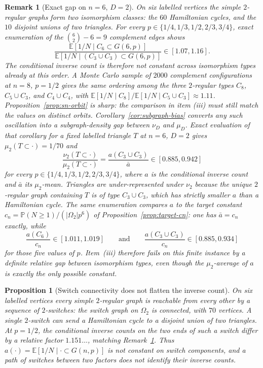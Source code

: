 \documentclass[11pt]{article}
\newtheorem{proposition}[theorem]{Proposition}
\newtheorem{remark}[theorem]{Remark}
\newcommand{\EE}{\mathbb{E}}
\newcommand{\PP}{\mathbb{P}}
\begin{document}
\begin{remark}[Exact gap on \(n=6\), \(D=2\)]
\label{rem:small-n-inv}
On six labelled vertices the simple \(2\)-regular graphs form two isomorphism
classes: the \(60\) Hamiltonian cycles, and the \(10\) disjoint unions of two
triangles.
For every \(p\in\{1/4,1/3,1/2,2/3,3/4\}\), exact enumeration of the
\(\binom{6}{2}-6=9\) complement edges shows
\[
\frac{\EE[1/N\mid C_6\subset G(6,p)]}{\EE[1/N\mid (C_3\cup C_3)\subset G(6,p)]}
\in
[1.07,1.16].
\]
The conditional inverse count is therefore not constant across isomorphism
types already at this order.
A Monte Carlo sample of \(2000\) complement configurations at \(n=8\), \(p=1/2\)
gives the same ordering among the three \(2\)-regular types
\(C_8\), \(C_5\cup C_3\), and \(C_4\cup C_4\), with
\(\EE[1/N\mid C_8]/\EE[1/N\mid C_5\cup C_3]\approx 1.11\).
Proposition~\ref{prop:sn-orbit} is sharp: the comparison in item (iii) must
still match the values on distinct orbits.
Corollary~\ref{cor:subgraph-bias} converts any such oscillation into a
subgraph-density gap between \(\nu_D\) and \(\mu_D\).
Exact evaluation of that corollary for a fixed labelled triangle \(T\) at
\(n=6\), \(D=2\) gives \(\mu_2(T\subset\cdot)=1/70\) and
\[
\frac{\nu_2(T\subset\cdot)}{\mu_2(T\subset\cdot)}
=
\frac{a(C_3\cup C_3)}{\bar a}
\in
[0.885,0.942]
\]
for every \(p\in\{1/4,1/3,1/2,2/3,3/4\}\), where \(a\) is the conditional
inverse count and \(\bar a\) its \(\mu_2\)-mean.
Triangles are under-represented under \(\nu_2\) because the unique
\(2\)-regular graph containing \(T\) is of type \(C_3\cup C_3\), which has
strictly smaller \(a\) than a Hamiltonian cycle.
The same enumeration compares \(a\) to the target constant
\(c_n=\PP(N\ge 1)/(\lvert\Omega_2\rvert p^{6})\) of
Proposition~\ref{prop:target-cn}: one has \(\bar a=c_n\) exactly, while
\[
\frac{a(C_6)}{c_n}\in[1.011,1.019]
\qquad\text{and}\qquad
\frac{a(C_3\cup C_3)}{c_n}\in[0.885,0.934]
\]
for those five values of \(p\).
Item~(iii) therefore fails on this finite instance by a definite relative gap
between isomorphism types, even though the \(\mu_2\)-average of \(a\) is exactly
the only possible constant.
\end{remark}

\begin{proposition}[Switch connectivity does not flatten the inverse count]
\label{prop:switch-not-flat-a}
On six labelled vertices every simple \(2\)-regular graph is reachable from every
other by a sequence of \(2\)-switches: the switch graph on \(\Omega_2\) is
connected, with \(70\) vertices.
A single \(2\)-switch can send a Hamiltonian cycle to a disjoint union of two
triangles.
At \(p=1/2\), the conditional inverse counts on the two ends of such a switch
differ by a relative factor \(1.151\ldots\), matching Remark~\ref{rem:small-n-inv}.
Thus \(a(\cdot)=\EE[1/N\mid\cdot\subset G(n,p)]\) is not constant on switch
components, and a path of switches between two factors does not identify their
inverse counts.
\end{proposition}
\end{document}
